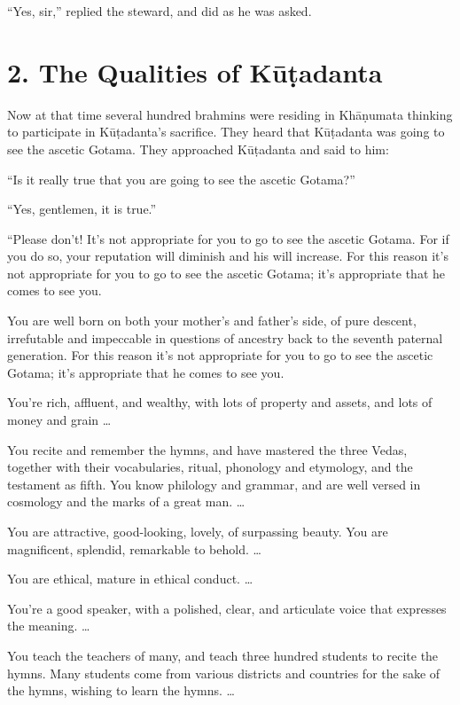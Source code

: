 \documentclass[12pt,openany]{book}%
\begin{document}
“Yes, sir,” replied the steward, and did as he was asked. 

\section*{2. The Qualities of \textsanskrit{Kūṭadanta} }

Now at that time several hundred brahmins were residing in \textsanskrit{Khāṇumata} thinking to participate in \textsanskrit{Kūṭadanta}’s sacrifice. They heard that \textsanskrit{Kūṭadanta} was going to see the ascetic Gotama. They approached \textsanskrit{Kūṭadanta} and said to him: 

“Is it really true that you are going to see the ascetic Gotama?” 

“Yes, gentlemen, it is true.” 

“Please don’t! It’s not appropriate for you to go to see the ascetic Gotama. For if you do so, your reputation will diminish and his will increase. For this reason it’s not appropriate for you to go to see the ascetic Gotama; it’s appropriate that he comes to see you. 

You are well born on both your mother’s and father’s side, of pure descent, irrefutable and impeccable in questions of ancestry back to the seventh paternal generation. For this reason it’s not appropriate for you to go to see the ascetic Gotama; it’s appropriate that he comes to see you. 

You’re rich, affluent, and wealthy, with lots of property and assets, and lots of money and grain … 

You recite and remember the hymns, and have mastered the three Vedas, together with their vocabularies, ritual, phonology and etymology, and the testament as fifth. You know philology and grammar, and are well versed in cosmology and the marks of a great man. … 

You are attractive, good-looking, lovely, of surpassing beauty. You are magnificent, splendid, remarkable to behold. … 

You are ethical, mature in ethical conduct. … 

You’re a good speaker, with a polished, clear, and articulate voice that expresses the meaning. … 

You teach the teachers of many, and teach three hundred students to recite the hymns. Many students come from various districts and countries for the sake of the hymns, wishing to learn the hymns. … 
\end{document}
